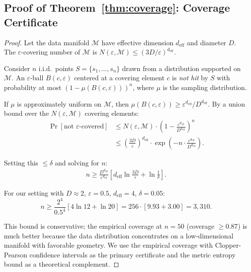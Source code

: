\documentclass[10pt]{article}
\begin{document}
\subsection{Proof of Theorem~\ref{thm:coverage}: Coverage Certificate}

\begin{proof}
Let the data manifold $\mathcal{M}$ have effective dimension $d_{\text{eff}}$ and diameter $D$.
The $\varepsilon$-covering number of $\mathcal{M}$ is $N(\varepsilon, \mathcal{M}) \leq (3D/\varepsilon)^{d_{\text{eff}}}$.

Consider $n$ i.i.d.\ points $S = \{s_1, \ldots, s_n\}$ drawn from a distribution supported on $\mathcal{M}$.
An $\varepsilon$-ball $B(c, \varepsilon)$ centered at a covering element $c$ is \emph{not hit} by $S$ with probability at most $(1 - \mu(B(c,\varepsilon)))^n$, where $\mu$ is the sampling distribution.

If $\mu$ is approximately uniform on $\mathcal{M}$, then $\mu(B(c,\varepsilon)) \geq \varepsilon^{d_{\text{eff}}} / D^{d_{\text{eff}}}$.
By a union bound over the $N(\varepsilon, \mathcal{M})$ covering elements:
\begin{align}
\Pr[\text{not } \varepsilon\text{-covered}] &\leq N(\varepsilon, \mathcal{M}) \cdot \left(1 - \frac{\varepsilon^{d_{\text{eff}}}}{D^{d_{\text{eff}}}}\right)^n \\
&\leq \left(\frac{3D}{\varepsilon}\right)^{d_{\text{eff}}} \cdot \exp\!\left(-n \cdot \frac{\varepsilon^{d_{\text{eff}}}}{D^{d_{\text{eff}}}}\right).
\end{align}

Setting this $\leq \delta$ and solving for $n$:
\begin{align}
n \geq \frac{D^{d_{\text{eff}}}}{\varepsilon^{d_{\text{eff}}}} \left[d_{\text{eff}} \ln\!\frac{3D}{\varepsilon} + \ln\frac{1}{\delta}\right].
\end{align}

For our setting with $D \approx 2$, $\varepsilon = 0.5$, $d_{\text{eff}} = 4$, $\delta = 0.05$:
\[
n \geq \frac{2^4}{0.5^4}\left[4 \ln 12 + \ln 20\right] = 256 \cdot [9.93 + 3.00] = 3{,}310.
\]

This bound is conservative; the empirical coverage at $n=50$ (coverage $\geq 0.87$) is much better because the data distribution concentrates on a low-dimensional manifold with favorable geometry. We use the empirical coverage with Clopper-Pearson confidence intervals as the primary certificate and the metric entropy bound as a theoretical complement.
\end{proof}
\end{document}
